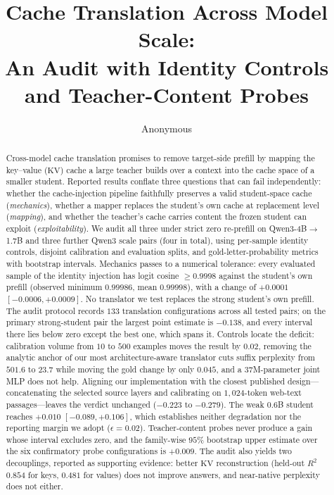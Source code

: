 \documentclass{article} %
\title{Cache Translation Across Model Scale:\\
An Audit with Identity Controls and Teacher-Content Probes}
\author{Anonymous}
\date{}
\newcommand{\kv}{\ensuremath{\mathrm{KV}}}
\begin{document}
\maketitle

\begin{abstract}
Cross-model cache translation promises to remove target-side prefill by mapping
the key--value (\kv) cache a large teacher builds over a context into the cache
space of a smaller student. Reported results conflate three questions that can
fail independently: whether the cache-injection pipeline faithfully preserves a
valid student-space cache (\emph{mechanics}), whether a mapper replaces the
student's own cache
at replacement level (\emph{mapping}), and whether the teacher's cache carries
content the frozen student can exploit (\emph{exploitability}). We audit all
three under strict zero re-prefill on Qwen3-4B$\to$1.7B and three further Qwen3
scale pairs (four in total), using per-sample identity controls, disjoint
calibration and evaluation splits, and gold-letter-probability metrics with
bootstrap intervals. Mechanics passes to a numerical tolerance: every evaluated
sample of the identity injection has logit cosine $\ge 0.9998$ against the
student's own prefill (observed minimum $0.99986$, mean $0.99998$), with a change
of $+0.0001$ $[-0.0006,+0.0009]$.
No translator we test replaces the strong student's own prefill. The audit
protocol records $133$ translation configurations across all tested pairs; on
the primary strong-student pair the largest point estimate is $-0.138$, and
every interval there lies below zero except the best one, which spans it. Controls locate the deficit:
calibration volume from $10$ to $500$ examples moves the result by $0.02$,
removing the analytic anchor of our most architecture-aware translator cuts
suffix perplexity from $501.6$ to $23.7$ while moving the gold change by only
$0.045$, and a $37$M-parameter joint MLP does not help. Aligning our implementation with the closest published design---concatenating
the selected source layers and calibrating on $1{,}024$-token web-text
passages---leaves the verdict unchanged ($-0.223$ to $-0.279$). The weak $0.6$B
student reaches $+0.010$ $[-0.089,+0.106]$, which establishes neither
degradation nor the reporting margin we adopt ($\epsilon{=}0.02$).
Teacher-content probes never produce a gain whose interval excludes zero, and the
family-wise $95\%$ bootstrap upper estimate over the six confirmatory probe
configurations is $+0.009$. The audit also yields two decouplings, reported as
supporting evidence: better \kv{} reconstruction (held-out $R^2$ $0.854$ for
keys, $0.481$ for values) does not improve answers, and near-native perplexity
does not either.
\end{abstract}
\end{document}
